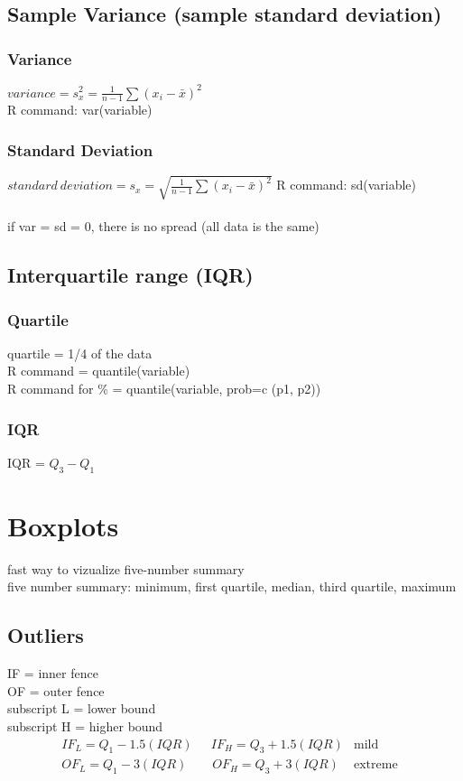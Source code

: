 \subsection{Sample Variance (sample standard deviation)}
\subsubsection{Variance}
$variance=s^2_x=\frac{1}{n-1}\sum(x_i-\bar{x})^2$\\
R command: var(variable)

\subsubsection{Standard Deviation}
$standard\ deviation=s_x=\sqrt{\frac{1}{n-1}\sum(x_i-\bar{x})^2}$
R command: sd(variable)\\\\
if var = sd = 0, there is no spread (all data is the same)

\subsection{Interquartile range (IQR)}
\subsubsection{Quartile}
quartile = 1/4 of the data\\
R command = quantile(variable)\\
R command for \% = quantile(variable, prob=c (p1, p2))

\subsubsection{IQR}
IQR = $Q_3-Q_1$\\

\section{Boxplots}
fast way to vizualize five-number summary\\
five number summary: minimum, first quartile, median, third quartile, maximum

\subsection{Outliers}
IF = inner fence\\
OF = outer fence\\
subscript L = lower bound\\
subscript H = higher bound
\begin{align}
     & IF_L=Q_1-1.5(IQR) \quad\ \ IF_H=Q_3+1.5(IQR) & \text{mild}    &  & \\
     & OF_L=Q_1-3(IQR) \qquad OF_H=Q_3+3(IQR)       & \text{extreme}
\end{align}

